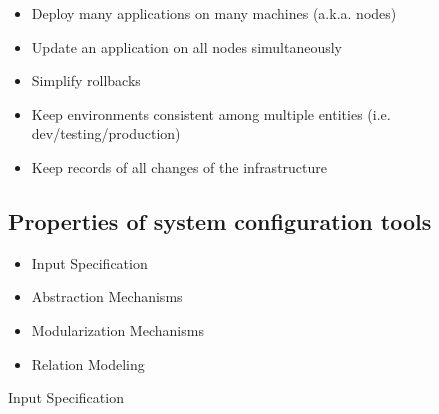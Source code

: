 	\begin{itemize}
		\item Deploy many applications on many machines (a.k.a. nodes)
		\item Update an application on all nodes simultaneously
		\item Simplify rollbacks
		\item Keep environments consistent among multiple entities (i.e. dev/testing/production)
		\item Keep records of all changes of the infrastructure
	\end{itemize}
	
\subsection{Properties of system configuration tools}
\begin{itemize}
\item Input Specification
\item Abstraction Mechanisms
\item Modularization Mechanisms
\item Relation Modeling
\end{itemize}
\item{Input Specification}
